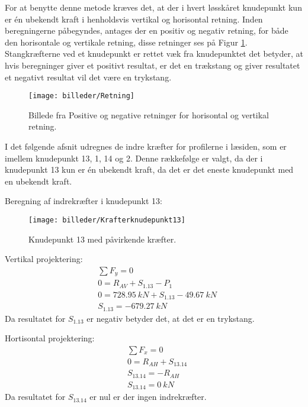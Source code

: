 For at benytte denne metode kræves det, at der i hvert løsskåret knudepunkt kun er én ubekendt kraft i henholdsvis vertikal og horisontal retning. Inden beregningerne påbegyndes, antages der en positiv og negativ retning, for både den horisontale og vertikale retning, disse retninger ses på Figur \ref{fig:Retning}. Stangkræfterne ved et knudepunkt er rettet væk fra knudepunktet det betyder, at hvis beregninger giver et positivt resultat, er det en trækstang og giver resultatet et negativt resultat vil det være en trykstang.
\begin{figure}[H] \centering
\texttt{[image: billeder/Retning]} 
\caption{Billede fra Positive og negative retninger for horisontal og vertikal retning.}
\label{fig:Retning}
\end{figure}

I det følgende afsnit udregnes de indre kræfter for profilerne i læsiden, som er imellem knudepunkt 13, 1, 14 og 2. Denne rækkefølge er valgt, da der i knudepunkt 13 kun er én ubekendt kraft, da det er det eneste knudepunkt med en ubekendt kraft. 

Beregning af indrekræfter i knudepunkt 13:
\begin{figure}[H] \centering
\texttt{[image: billeder/Krafterknudepunkt13]} \caption{Knudepunkt 13 med påvirkende kræfter.}
\end{figure}

Vertikal projektering:
\begin{align*}
& \sum F_{y} = 0 \\&
0 = R_{AV} + S_{1.13} - P_{1} \\&
0 = \SI{728,95}{kN} + S_{1.13} - \SI{49,67}{kN} \\&
S_{1.13} = \SI{-679,27}{kN}
\end{align*}
Da resultatet for $S_{1.13}$ er negativ betyder det, at det er en trykstang.

Hortisontal projektering:
\begin{align*}
& \sum F_{x} = 0 \\
& 0 = R_{AH} + S_{13.14} \\
& S_{13.14} = - R_{AH} \\
& S_{13.14} = \SI{0}{kN}
\end{align*}
Da resultatet for $S_{13.14}$ er nul er der ingen indrekræfter.

